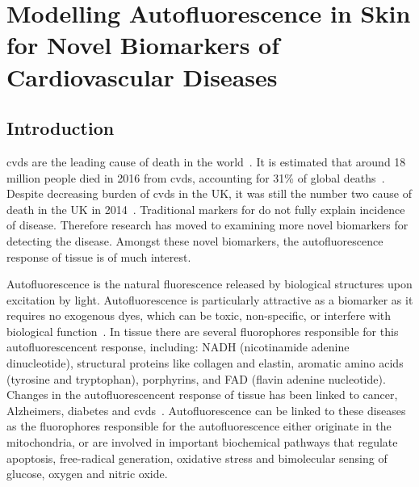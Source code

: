 \chapter{Modelling Autofluorescence in Skin for Novel Biomarkers of Cardiovascular Diseases}
\label{chap:salvo}




\section{Introduction}


\Gls*{cvds} are the leading cause of death in the world~\cite{whodeath}.
It is estimated that around 18 million people died in 2016 from \gls*{cvds}, accounting for 31\% of global deaths~\cite{whodeath}.
Despite decreasing burden of \gls*{cvds} in the UK, it was still the number two cause of death in the UK in 2014~\cite{bhatnagar2016trends}.
Traditional markers for do not fully explain incidence of disease.
Therefore research has moved to examining more novel biomarkers for detecting the disease.
Amongst these novel biomarkers, the autofluorescence response of tissue is of much interest.

Autofluorescence is the natural fluorescence released by biological structures upon excitation by light.
Autofluorescence is particularly attractive as a biomarker as it requires no exogenous dyes, which can be toxic, non-specific, or interfere with biological function~\cite{kollias1998endogenous}.
In tissue there are several fluorophores responsible for this autofluorescencent response, including: NADH (nicotinamide adenine dinucleotide), structural proteins like collagen and elastin, aromatic amino acids (tyrosine and tryptophan), porphyrins, and FAD (flavin adenine nucleotide).
Changes in the autofluorescencent response of tissue has been linked to cancer, Alzheimers, diabetes and \gls*{cvds}~\cite{drakaki2009laser}.
Autofluorescence can be linked to these diseases as the fluorophores responsible for the autofluorescence either originate in the mitochondria, or are involved in important biochemical pathways that regulate apoptosis, free-radical generation, oxidative stress and bimolecular sensing of glucose, oxygen and nitric oxide.

